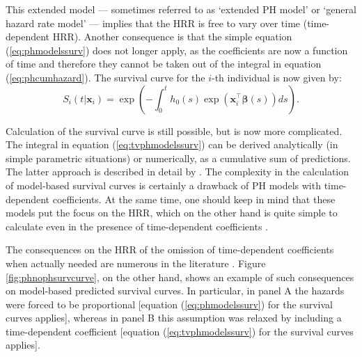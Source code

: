 This extended model --- sometimes referred to as `extended PH model' or `general hazard rate model' ---  implies that the HRR is free to vary over time (time-dependent HRR). Another consequence is that the simple equation (\ref{eq:phmodelssurv}) does not longer apply, as the coefficients are now a function of time and therefore they cannot be taken out of the integral in equation (\ref{eq:phcumhazard}). The survival curve for the $i$-th individual is now given by:
\begin{equation}
S_i(t|\mathbf{x}_i) = \exp\left(-\int_0^t h_0(s)\exp \left(\mathbf{x}_i^\top\boldsymbol{\beta}(s)\right) ds \right).
\label{eq:tvphmodelssurv}
\end{equation}

Calculation of the survival curve is still possible, but is now more complicated. The integral in equation (\ref{eq:tvphmodelssurv}) can be derived analytically (in simple parametric situations) or numerically, as a cumulative sum of predictions. The latter approach is described in detail by \citet[section 4]{carstensen_demography_2005}. The complexity in the calculation of model-based survival curves is certainly a drawback of PH models with time-dependent coefficients. At the same time, one should keep in mind that these models put the focus on the HRR, which on the other hand is quite simple to calculate even in the presence of time-dependent coefficients \citep{heinzl_gaining_1997}.

The consequences on the HRR of the omission of time-dependent coefficients  when actually needed are numerous in the literature \citep[see, for example,][]{royston_use_2011, uno_moving_2014}. Figure \ref{fig:phnophsurvcurve}, on the other hand, shows an example of such consequences on model-based predicted survival curves. In particular, in panel A the hazards were forced to be proportional [equation (\ref{eq:phmodelssurv}) for the survival curves applies], whereas in panel B this assumption was relaxed by including a time-dependent coefficient [equation (\ref{eq:tvphmodelssurv}) for the survival curves applies].

